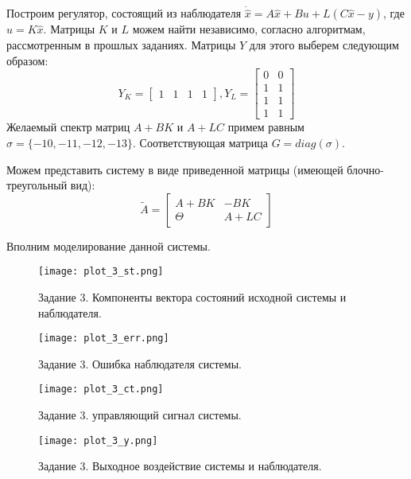 Построим регулятор, состоящий из наблюдателя $\dot{\hat x} = A\hat x + Bu + L(C\hat x - y)$,
где $u = K\hat x$. Матрицы $K$ и $L$ можем найти независимо, согласно алгоритмам, рассмотренным
в прошлых заданиях. Матрицы $Y$ для этого выберем следующим образом:
\begin{equation*}
    Y_K = \begin{bmatrix}
        1 & 1 & 1 & 1
    \end{bmatrix},
    Y_L = \begin{bmatrix}
        0 & 0 \\
        1 & 1 \\
        1 & 1 \\
        1 & 1
    \end{bmatrix}
\end{equation*}
Желаемый спектр матриц $A + BK$ и $A + LC$ примем равным $\sigma=\{-10,-11,-12,-13\}$.
Соответствующая матрица $G=diag(\sigma)$.

Можем представить систему в виде приведенной матрицы (имеющей блочно-треугольный вид):
\begin{equation}
    \tilde{A} = \begin{bmatrix}
        A + BK & -BK \\
        \Theta & A + LC
    \end{bmatrix}
\end{equation}

Вполним моделирование данной системы.
\begin{figure}[]
    \centering
    \texttt{[image: plot\_3\_st.png]}
    \caption{\label{fig:The-caption-1}Задание 3. Компоненты вектора состояний исходной системы и наблюдателя.}
\end{figure}
\begin{figure}[]
    \centering
    \texttt{[image: plot\_3\_err.png]}
    \caption{\label{fig:The-caption-1}Задание 3. Ошибка наблюдателя системы.}
\end{figure}
\begin{figure}[]
    \centering
    \texttt{[image: plot\_3\_ct.png]}
    \caption{\label{fig:The-caption-1}Задание 3. управляющий сигнал системы.}
\end{figure}
\begin{figure}[]
    \centering
    \texttt{[image: plot\_3\_y.png]}
    \caption{\label{fig:The-caption-1}Задание 3. Выходное воздействие системы и наблюдателя.}
\end{figure}
\pagebreak

